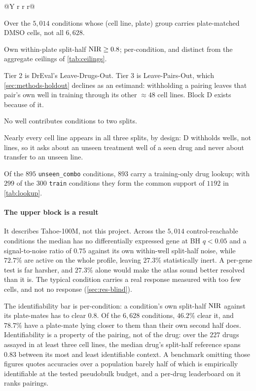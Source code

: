 \begin{table}[htbp]
\begin{fullwidth}
\begin{minipage}{\linewidth}
\begin{threeparttable}
\begin{tabularx}{\linewidth}{@{}Y r r r@{}}
\end{tabularx}
\begin{tablenotes}[flushleft]
\item[a] Over the $5{,}014$ conditions whose (cell line, plate) group carries
plate-matched DMSO cells, not all $6{,}628$.
\item[b] Own within-plate split-half $\textrm{NIR} \geq 0.8$; per-condition, and distinct
from the aggregate ceilings of \cref{tab:ceilings}.
\item[c] Tier 2 is DrEval's Leave-Drugs-Out. Tier 3 is Leave-Pairs-Out, which
\cref{sec:methods-holdout} declines as an estimand: withholding a pairing leaves
that pair's own well in training through its other $\approx 48$ cell lines.
Block D exists because of it.
\item[d] No well contributes conditions to two splits.
\item[e] Nearly every cell line appears in all three splits, by design: D
withholds wells, not lines, so it asks about an unseen treatment well of a seen
drug and never about transfer to an unseen line.
\item Of the $895$ \texttt{unseen\_combo} conditions, $893$ carry a training-only
drug lookup; with $299$ of the $300$ \texttt{train} conditions they form the
common support of $\num{1192}$ in \cref{tab:lookup}.
\end{tablenotes}
\end{threeparttable}
\end{minipage}
\end{fullwidth}
\end{table}

\paragraph{The upper block is a result} It describes Tahoe-100M, not this
project. Across the $5{,}014$ control-reachable conditions the median has no
differentially expressed gene at BH $q<0.05$ and a signal-to-noise ratio of
$0.75$ against its own within-well split-half noise, while $72.7\%$ are active
on the whole profile, leaving $27.3\%$ statistically inert. A per-gene test is
far harsher, and $27.3\%$ alone would make the atlas sound better resolved than
it is. The typical condition carries a real response
measured with too few cells, and not no response (\cref{sec:res-blind}).

The identifiability bar is per-condition: a condition's own split-half $\textrm{NIR}$
against its plate-mates has to clear $0.8$. Of the $6{,}628$ conditions,
$46.2\%$ clear it, and $78.7\%$ have a plate-mate lying closer to them than
their own second half does. Identifiability is a property of the pairing, not of
the drug: over the $227$ drugs assayed in at least three cell lines, the median
drug's split-half reference spans $0.83$ between its most and least identifiable
context. A benchmark omitting those figures
quotes accuracies over a population barely half of which is empirically
identifiable at the tested pseudobulk budget, and a per-drug leaderboard on it
ranks pairings.

